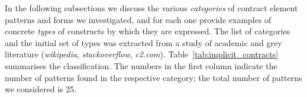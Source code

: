 \documentclass[a4paper,UKenglish]{lipics-v2016}
\begin{document}
In the following subsections we discuss the various {\em categories} of contract element patterns and forms we investigated, and for each one provide examples of concrete {\em types} of constructs by which they are expressed.  The list of categories and the initial set of types was extracted from a study of academic and grey literature (\textit{wikipedia}, \textit{stackoverflow}, \textit{c2.com}). Table~\ref{tab:implicit_contracts} summarises the classification. The numbers in the first column indicate the number of patterns found in the respective category; the total number of patterns we considered is 25.  

\end{document}
